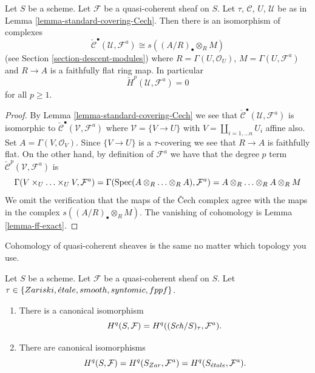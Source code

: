 \begin{lemma}
\label{lemma-standard-covering-Cech-quasi-coherent}
Let $S$ be a scheme. Let $\mathcal{F}$ be a quasi-coherent sheaf on $S$.
Let $\tau$, $\mathcal{C}$, $U$, $\mathcal{U}$ be as in
Lemma \ref{lemma-standard-covering-Cech}. Then there is an isomorphism
of complexes
$$
\check{\mathcal{C}}^\bullet(\mathcal{U}, \mathcal{F}^a)
\cong
s((A/R)_\bullet \otimes_R M)
$$
(see Section \ref{section-descent-modules})
where $R = \Gamma(U, \mathcal{O}_U)$, $M = \Gamma(U, \mathcal{F}^a)$
and $R \to A$ is a faithfully flat ring map. In particular
$$
\check{H}^p(\mathcal{U}, \mathcal{F}^a) = 0
$$
for all $p \geq 1$.
\end{lemma}

\begin{proof}
By Lemma \ref{lemma-standard-covering-Cech} we see that
$\check{\mathcal{C}}^\bullet(\mathcal{U}, \mathcal{F}^a)$
is isomorphic to $\check{\mathcal{C}}^\bullet(\mathcal{V}, \mathcal{F}^a)$
where $\mathcal{V} = \{V \to U\}$ with $V = \coprod_{i = 1, \ldots n} U_i$
affine also. Set $A = \Gamma(V, \mathcal{O}_V)$. Since $\{V \to U\}$
is a $\tau$-covering we see that $R \to A$ is faithfully flat.
On the other hand, by definition of $\mathcal{F}^a$ we have
that the degree $p$ term $\check{\mathcal{C}}^p(\mathcal{V}, \mathcal{F}^a)$
is
$$
\Gamma(V \times_U \ldots \times_U V, \mathcal{F}^a)
=
\Gamma(\mathop{\mathrm{Spec}}(A \otimes_R \ldots \otimes_R A), \mathcal{F}^a)
=
A \otimes_R \ldots \otimes_R A \otimes_R M
$$
We omit the verification that the maps of the {\v C}ech complex agree with
the maps in the complex $s((A/R)_\bullet \otimes_R M)$. The vanishing
of cohomology is Lemma \ref{lemma-ff-exact}.
\end{proof}

\begin{proposition}
\label{proposition-same-cohomology-quasi-coherent}
\begin{slogan}
Cohomology of quasi-coherent sheaves is the same no matter which
topology you use.
\end{slogan}
Let $S$ be a scheme. Let $\mathcal{F}$ be a quasi-coherent sheaf on $S$.
Let $\tau \in \{Zariski, \linebreak[0] \etale, \linebreak[0]
smooth, \linebreak[0] syntomic, \linebreak[0] fppf\}$.
\begin{enumerate}
\item There is a canonical isomorphism
$$
H^q(S, \mathcal{F}) = H^q((\mathit{Sch}/S)_\tau, \mathcal{F}^a).
$$
\item There are canonical isomorphisms
$$
H^q(S, \mathcal{F}) =
H^q(S_{Zar}, \mathcal{F}^a) =
H^q(S_{\acute{e}tale}, \mathcal{F}^a).
$$
\end{enumerate}
\end{proposition}


